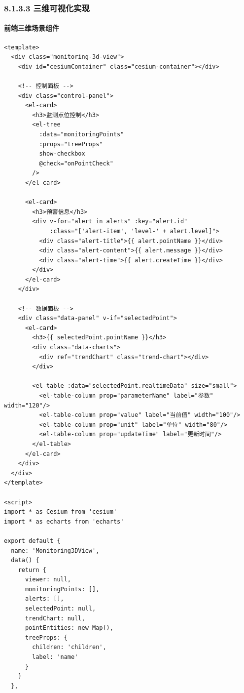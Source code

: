 \subsubsection{8.1.3.3
三维可视化实现}\label{ux4e09ux7ef4ux53efux89c6ux5316ux5b9eux73b0}

\paragraph{前端三维场景组件}\label{ux524dux7aefux4e09ux7ef4ux573aux666fux7ec4ux4ef6}

\begin{lstlisting}
<template>
  <div class="monitoring-3d-view">
    <div id="cesiumContainer" class="cesium-container"></div>
    
    <!-- 控制面板 -->
    <div class="control-panel">
      <el-card>
        <h3>监测点位控制</h3>
        <el-tree
          :data="monitoringPoints"
          :props="treeProps"
          show-checkbox
          @check="onPointCheck"
        />
      </el-card>
      
      <el-card>
        <h3>预警信息</h3>
        <div v-for="alert in alerts" :key="alert.id" 
             :class="['alert-item', 'level-' + alert.level]">
          <div class="alert-title">{{ alert.pointName }}</div>
          <div class="alert-content">{{ alert.message }}</div>
          <div class="alert-time">{{ alert.createTime }}</div>
        </div>
      </el-card>
    </div>
    
    <!-- 数据面板 -->
    <div class="data-panel" v-if="selectedPoint">
      <el-card>
        <h3>{{ selectedPoint.pointName }}</h3>
        <div class="data-charts">
          <div ref="trendChart" class="trend-chart"></div>
        </div>
        
        <el-table :data="selectedPoint.realtimeData" size="small">
          <el-table-column prop="parameterName" label="参数" width="120"/>
          <el-table-column prop="value" label="当前值" width="100"/>
          <el-table-column prop="unit" label="单位" width="80"/>
          <el-table-column prop="updateTime" label="更新时间"/>
        </el-table>
      </el-card>
    </div>
  </div>
</template>

<script>
import * as Cesium from 'cesium'
import * as echarts from 'echarts'

export default {
  name: 'Monitoring3DView',
  data() {
    return {
      viewer: null,
      monitoringPoints: [],
      alerts: [],
      selectedPoint: null,
      trendChart: null,
      pointEntities: new Map(),
      treeProps: {
        children: 'children',
        label: 'name'
      }
    }
  },
  

\end{lstlisting}
